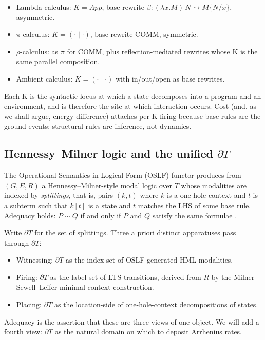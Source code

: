 \documentclass[11pt]{article}
\theoremstyle{plain}
\theoremstyle{definition}
\theoremstyle{remark}
\newcommand{\rew}{\rightsquigarrow}
\newcommand{\bd}{\partial}
\begin{document}
\begin{itemize}
\item Lambda calculus: $K = \mathit{App}$, base rewrite $\beta : (\lambda x.M)\,N \rew M\{N/x\}$, asymmetric.
\item $\pi$-calculus: $K = (\cdot \mid \cdot)$, base rewrite COMM, symmetric.
\item $\rho$-calculus: as $\pi$ for COMM, plus reflection-mediated rewrites whose K is the same parallel composition.
\item Ambient calculus: $K = (\cdot \mid \cdot)$ with in/out/open as base rewrites.
\end{itemize}

Each K is the syntactic locus at which a state decomposes into a program and an environment, and is therefore the site at which interaction occurs. Cost (and, as we shall argue, energy difference) attaches per K-firing because base rules are the ground events; structural rules are inference, not dynamics.

\subsection{Hennessy--Milner logic and the unified $\bd T$}\label{sec:oslf-intro}

The Operational Semantics in Logical Form (OSLF) functor produces from $(G, E, R)$ a Hennessy--Milner-style modal logic over $T$ whose modalities are indexed by \emph{splittings}, that is, pairs $(k, t)$ where $k$ is a one-hole context and $t$ is a subterm such that $k[t]$ is a state and $t$ matches the LHS of some base rule. Adequacy holds: $P \sim Q$ if and only if $P$ and $Q$ satisfy the same formulae \cite{HM85,oslf-meredith}.

Write $\bd T$ for the set of splittings. Three a priori distinct apparatuses pass through $\bd T$:

\begin{itemize}
\item Witnessing: $\bd T$ as the index set of OSLF-generated HML modalities.
\item Firing: $\bd T$ as the label set of LTS transitions, derived from $R$ by the Milner--Sewell--Leifer minimal-context construction.
\item Placing: $\bd T$ as the location-side of one-hole-context decompositions of states.
\end{itemize}

Adequacy is the assertion that these are three views of one object. We will add a fourth view: $\bd T$ as the natural domain on which to deposit Arrhenius rates.
\end{document}

